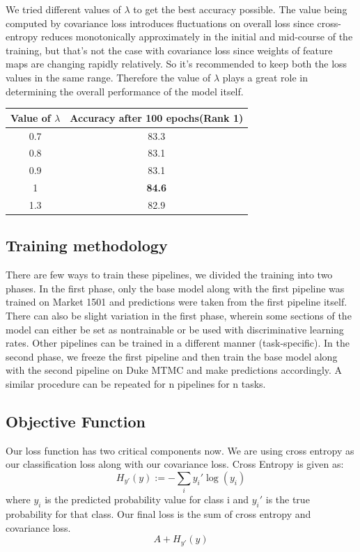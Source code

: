 \documentclass[10pt,twocolumn,letterpaper]{article}
\begin{document}
We tried different values of $\lambda$ to get the best accuracy possible. The value being computed by covariance loss introduces fluctuations on overall loss since cross-entropy reduces monotonically approximately in the initial and mid-course of the training, but that's not the case with covariance loss since weights of feature maps are changing rapidly relatively. So it's recommended to keep both the loss values in the same range. Therefore the value of $\lambda$ plays a great role in determining the overall performance of the model itself.
\begin{center}
 \begin{tabular}{||c c||} 
 \hline
 Value of $\lambda$ & Accuracy after 100 epochs(Rank 1) \\ [0.5ex] 
 \hline\hline
 0.7 & 83.3 \\ 
 \hline
 0.8 & 83.1 \\ 
 \hline
 0.9 & 83.1 \\ 
 \hline
 1 & \textbf{84.6} \\
 \hline
 1.3 & 82.9  \\ [1ex] 
 \hline
\end{tabular}
\end{center}

\subsection{Training methodology}
There are few ways to train these pipelines, we divided the training into two phases. In the first phase, only the base model along with the first pipeline was trained on Market 1501 and predictions were taken from the first pipeline itself. There can also be slight variation in the first phase, wherein some sections of the model can either be set as nontrainable or be used with discriminative learning rates. Other pipelines can be trained in a different manner (task-specific). In the second phase, we freeze the first pipeline and then train the base model along with the second pipeline on Duke MTMC and make predictions accordingly. A similar procedure can be repeated for n pipelines for n tasks.

\subsection{Objective Function}
Our loss function has two critical components now. We are using cross entropy as our classification loss along with our covariance loss. 
Cross Entropy is given as:
\begin{equation}
 H_{y'} (y) := - \sum_{i} y_{i}' \log (y_i) 
\end{equation}
where $y_i$ is the predicted probability value for class i and $ y_i'$ is the true probability for that class.
Our final loss is the sum of cross entropy and covariance loss.
\begin{equation}
A + H_{y'} (y)
\end{equation}
\end{document}
